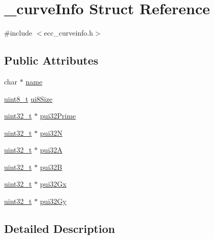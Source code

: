 \hypertarget{struct__curve_info}{}\section{\+\_\+curve\+Info Struct Reference}
\label{struct__curve_info}


{\ttfamily \#include $<$ecc\+\_\+curveinfo.\+h$>$}

\subsection*{Public Attributes}
\begin{DoxyCompactItemize}
\item 
char $\ast$ \hyperlink{struct__curve_info_a5a7b1d57036dacaa60f1e60b4b38810f}{name}
\item 
\hyperlink{_p_e___types_8h_aba7bc1797add20fe3efdf37ced1182c5}{uint8\+\_\+t} \hyperlink{struct__curve_info_ac038a82224bff087e41f13716e48627f}{ui8\+Size}
\item 
\hyperlink{_p_e___types_8h_a33594304e786b158f3fb30289278f5af}{uint32\+\_\+t} $\ast$ \hyperlink{struct__curve_info_a888c510eef34d3e6399bf28ce28664f4}{pui32\+Prime}
\item 
\hyperlink{_p_e___types_8h_a33594304e786b158f3fb30289278f5af}{uint32\+\_\+t} $\ast$ \hyperlink{struct__curve_info_ae2eb1ef51fae0debe14b280274d467c3}{pui32N}
\item 
\hyperlink{_p_e___types_8h_a33594304e786b158f3fb30289278f5af}{uint32\+\_\+t} $\ast$ \hyperlink{struct__curve_info_aada25fbc79f3b7f2b9752f756ca54d4f}{pui32A}
\item 
\hyperlink{_p_e___types_8h_a33594304e786b158f3fb30289278f5af}{uint32\+\_\+t} $\ast$ \hyperlink{struct__curve_info_a8a13e3aa2a7ec1b09a765a058d64cc27}{pui32B}
\item 
\hyperlink{_p_e___types_8h_a33594304e786b158f3fb30289278f5af}{uint32\+\_\+t} $\ast$ \hyperlink{struct__curve_info_a06c588a16a514e0df0744a5cb8dc18f2}{pui32\+Gx}
\item 
\hyperlink{_p_e___types_8h_a33594304e786b158f3fb30289278f5af}{uint32\+\_\+t} $\ast$ \hyperlink{struct__curve_info_ab4de3eed70dd7148c99cff0f8f750c2f}{pui32\+Gy}
\end{DoxyCompactItemize}


\subsection{Detailed Description}


